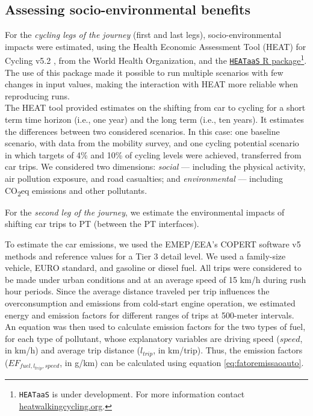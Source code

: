 \documentclass[review, doubleblind, 3p,
authoryear]{elsarticle} %
\providecommand{\DIFaddtex}[1]{{\protect\color{green}{#1}}} %
\providecommand{\DIFaddbegin}{} %
\providecommand{\DIFaddend}{} %
\providecommand{\DIFadd}[1]{\texorpdfstring{\DIFaddtex{#1}}{#1}} %
\newcommand{\DIFaddincludegraphics}[2][]{{\color{blue}\fbox{\DIFOincludegraphics[#1]{#2}}}} %
\DeclareRobustCommand{\DIFaddbegin}{\DIFOaddbegin \let\includegraphics\DIFaddincludegraphics} %
\DeclareRobustCommand{\DIFaddend}{\DIFOaddend \let\includegraphics\DIFOincludegraphics} %
\begin{document}
\DIFaddend \subsection{Assessing socio-environmental
benefits}\label{assessing-socio-environmental-benefits}

\DIFaddbegin \DIFadd{Following the clearly established national strategy, we estimated the
socio-environmental potential impacts of shifting car trips by bicycle
in combination with PT, in the LMA, for the two targets (4\% and 10\%).
}

\DIFaddend For the \emph{cycling legs of the journey} (first and last legs),
socio-environmental impacts were estimated, using the Health Economic
Assessment Tool (HEAT) for Cycling v5.2 \citep{HEAT}, from the World
Health Organization, and the
\href{https://github.com/HEAT-WHO/HEAT_heatr_api}{\texttt{HEATaaS} R
package}\footnote{\texttt{HEATaaS} is under development. For more
  information contact
  \href{https://heatwalkingcycling.org}{heatwalkingcycling.org}.}. The
use of this package made it possible to run multiple scenarios with few
changes in input values, making the interaction with HEAT more reliable
when reproducing runs.\\
The HEAT tool provided estimates on the shifting from car to cycling for
a short term time horizon (i.e., one year) and the long term (i.e., ten
years). It estimates the differences between two considered scenarios.
In this case: one baseline scenario, with data from the mobility survey,
and one cycling potential scenario in which targets of 4\% and 10\% of
cycling levels were achieved, transferred from car trips. We considered
two dimensions: \emph{social} --- including the physical activity, air
pollution exposure, and road casualties; and \emph{environmental} ---
including CO\textsubscript{2}eq emissions and other pollutants.

For the \emph{second leg of the journey}, we estimate the environmental
impacts of shifting car trips to PT (between the PT interfaces).

To estimate the car emissions, we used the EMEP/EEA's COPERT software v5
methods and reference values \citep{COPERT} for a Tier 3 detail level.
We used a family-size vehicle, EURO standard, and gasoline or diesel
fuel. All trips were considered to be made under urban conditions and at
an average speed of 15 km/h during rush hour periods. Since the average
distance traveled per trip influences the overconsumption and emissions
from cold-start engine operation, we estimated energy and emission
factors for different ranges of trips at 500-meter intervals.\\
An equation was then used to calculate emission factors for the two
types of fuel, for each type of pollutant, whose explanatory variables
are driving speed (\(speed\), in km/h) and average trip distance
(\(l_{trip}\), in km/trip). Thus, the emission factors
(\(EF_{fuel,l_{trip},speed}\), in g/km) can be calculated using equation
\ref{eq:fatoremissaoauto}.
\end{document}
